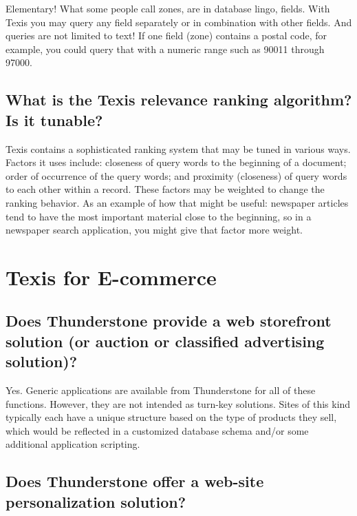 Elementary! What some people call zones, are in database lingo,
fields. With Texis you may query any field separately or in
combination with other fields. And queries are not limited to text! If
one field (zone) contains a postal code, for example, you could query
that with a numeric range such as 90011 through 97000.

\section{What is the Texis relevance ranking algorithm? Is it tunable? }

Texis contains a sophisticated ranking system that may be tuned in
various ways. Factors it uses include: closeness of query words to the
beginning of a document; order of occurrence of the query words; and
proximity (closeness) of query words to each other within a
record. These factors may be weighted to change the ranking
behavior. As an example of how that might be useful: newspaper
articles tend to have the most important material close to the
beginning, so in a newspaper search application, you might give that
factor more weight.

\chapter{Texis for E-commerce }

\section{Does Thunderstone provide a web storefront solution (or auction or classified advertising solution)? }

Yes. Generic applications are available from Thunderstone for all of
these functions. However, they are not intended as turn-key
solutions. Sites of this kind typically each have a unique structure
based on the type of products they sell, which would be reflected in a
customized database schema and/or some additional application
scripting.

\section{Does Thunderstone offer a web-site personalization solution? }

